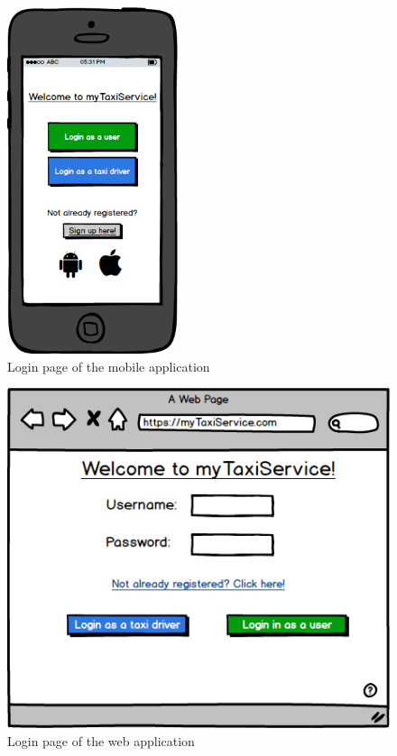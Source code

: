 \begin{figure}[H]
    \centering
    \includegraphics[width=5cm]{./Mockups/Login.png}
    \caption{Login page of the mobile application}
\end{figure}

\begin{figure}[H]
    \centering
    \includegraphics[width=\textwidth]{./Mockups/LoginWeb.png}
    \caption{Login page of the web application}
\end{figure}